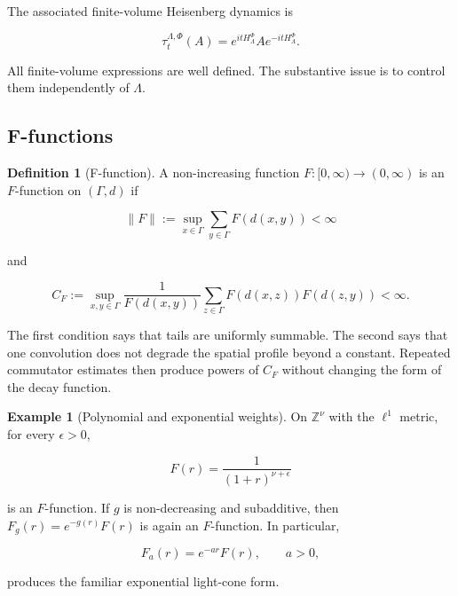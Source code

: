 \documentclass[12pt]{article}
\theoremstyle{definition}
\newtheorem{definition}[theorem]{Definition}
\newtheorem{example}[theorem]{Example}
\theoremstyle{remark}
\begin{document}
The associated finite-volume Heisenberg dynamics is

\begin{equation}
  \tau^{\Lambda,\Phi}_t(A)
  =e^{itH^\Phi_\Lambda}Ae^{-itH^\Phi_\Lambda}.
\end{equation}

All finite-volume expressions are well defined.  The substantive issue is to
control them independently of $\Lambda$.

\subsection{F-functions}

\begin{definition}[F-function]
A non-increasing function $F:[0,\infty)\to(0,\infty)$ is an $F$-function on
$(\Gamma,d)$ if

\begin{equation}
  \|F\|
  :=\sup_{x\in\Gamma}\sum_{y\in\Gamma}F(d(x,y))<\infty
  \label{eq:F-sum}
\end{equation}

and

\begin{equation}
  C_F
  :=\sup_{x,y\in\Gamma}
  \frac{1}{F(d(x,y))}
  \sum_{z\in\Gamma}F(d(x,z))F(d(z,y))<\infty.
  \label{eq:F-conv}
\end{equation}
\end{definition}

The first condition says that tails are uniformly summable.  The second says
that one convolution does not degrade the spatial profile beyond a constant.
Repeated commutator estimates then produce powers of $C_F$ without changing
the form of the decay function.

\begin{example}[Polynomial and exponential weights]
On $\mathbb Z^\nu$ with the $\ell^1$ metric, for every $\epsilon>0$,

\begin{equation}
  F(r)=\frac{1}{(1+r)^{\nu+\epsilon}}
\end{equation}

is an $F$-function.  If $g$ is non-decreasing and subadditive, then
$F_g(r)=e^{-g(r)}F(r)$ is again an $F$-function.  In particular,

\begin{equation}
  F_a(r)=e^{-ar}F(r),\qquad a>0,
\end{equation}

produces the familiar exponential light-cone form.
\end{example}
\end{document}
